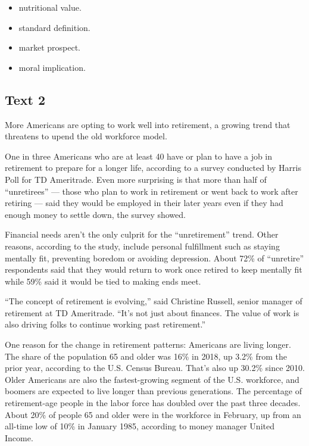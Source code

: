 \documentclass[UTF8,11pt]{ctexart}
\begin{document}
\begin{itemize}[leftmargin=2em,itemsep=.2em,topsep=.4em]\item[A.] nutritional value.
\item[B.] standard definition.
\item[C.] market prospect.
\item[D.] moral implication.
\end{itemize}

\subsection*{\textbf{Text 2}}


More Americans are opting to work well into retirement, a growing trend that threatens to upend the old workforce model.


One in three Americans who are at least 40 have or plan to have a job in retirement to prepare for a longer life, according to a survey conducted by Harris Poll for TD Ameritrade. Even more surprising is that more than half of “unretirees” — those who plan to work in retirement or went back to work after retiring — said they would be employed in their later years even if they had enough money to settle down, the survey showed.


Financial needs aren’t the only culprit for the “unretirement” trend. Other reasons, according to the study, include personal fulfillment such as staying mentally fit, preventing boredom or avoiding depression. About 72\% of “unretire” respondents said that they would return to work once retired to keep mentally fit while 59\% said it would be tied to making ends meet.


“The concept of retirement is evolving,” said Christine Russell, senior manager of retirement at TD Ameritrade. “It’s not just about finances. The value of work is also driving folks to continue working past retirement.”


One reason for the change in retirement patterns: Americans are living longer. The share of the population 65 and older was 16\% in 2018, up 3.2\% from the prior year, according to the U.S. Census Bureau. That’s also up 30.2\% since 2010. Older Americans are also the fastest-growing segment of the U.S. workforce, and boomers are expected to live longer than previous generations. The percentage of retirement-age people in the labor force has doubled over the past three decades. About 20\% of people 65 and older were in the workforce in February, up from an all-time low of 10\% in January 1985, according to money manager United Income.
\end{document}
